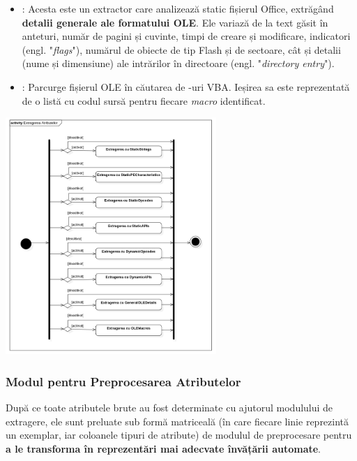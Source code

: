 \documentclass[../../main.tex]{subfiles}
\begin{document}
\begin{itemize}
    \item {}: Acesta este un extractor care analizează static fișie\-rul Office, extrăgând \textbf{detalii generale ale formatului OLE}. Ele variază de la text găsit în anteturi, număr de pagini și cuvinte, timpi de creare și modificare, indicatori (engl. "\textit{flags}"), numărul de obiecte de tip Flash și de sectoare, cât și detalii (nume și dimensiune) ale intrărilor în directoare (engl. "\textit{directory entry}").
    \item {}: Parcurge fișierul OLE în căutarea de -uri VBA. Ieșirea sa este reprezentată de o listă cu codul sursă pentru fiecare \textit{macro} identificat.
\end{itemize}

\vspace{0.3cm}
\begin{center}
    \includegraphics[width=8cm]{components/images/diagrams/activity_diagram_attribute_extraction.png}
    \label{fig:activity_diagram_attribute_extraction}
    \captionsetup{justification=centering,margin=1cm}
\end{center}

\subsubsection{Modul pentru Preprocesarea Atributelor}

După ce toate atributele brute au fost determinate cu ajutorul modulului de extragere, ele sunt preluate sub formă matriceală (în care fiecare linie reprezintă un exemplar, iar coloanele tipuri de atribute) de modulul de preprocesare pentru \textbf{a le transforma în reprezentări mai adecvate învățării automate}.
\end{document}
